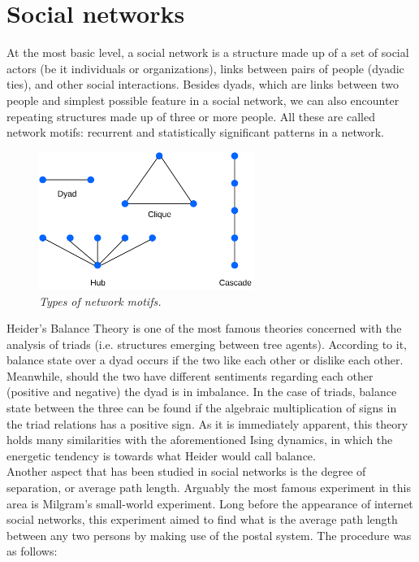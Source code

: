 \documentclass[12pt,openright,twoside]{book}
\begin{document}
\section{Social networks}

At the most basic level, a social network is a structure made up of a set of social actors (be it individuals or organizations), links between pairs of people (dyadic ties), and other social interactions\cite{hancean_2014,carrington_scott_2014}. Besides dyads, which are links between two people and simplest possible feature in a social network, we can also encounter repeating structures made up of three or more people. All these are called network motifs: recurrent and statistically significant patterns in a network.\\

\begin{figure}
\centering
\includegraphics[width=7cm]{figures/network_motifs.png}
\caption{\textit{{\small Types of network motifs.}}}
\label{fig1}
\end{figure}

Heider's Balance Theory\cite{heider_1958} is one of the most famous theories concerned with the analysis of triads (i.e. structures emerging between tree agents).  According to it, balance state over a dyad occurs if the two like each other or dislike each other. Meanwhile, should the two have different sentiments regarding each other (positive and negative) the dyad is in imbalance. In the case of triads, balance state between the three can be found if the algebraic multiplication of signs in the triad relations has a positive sign. As it is immediately apparent, this theory holds many similarities with the aforementioned Ising dynamics, in which the energetic tendency is towards what Heider would call balance.\\

Another aspect that has been studied in social networks is the degree of separation, or average path length\cite{newman_barabasi_2006}. Arguably the most famous experiment in this area is Milgram's small-world experiment\cite{milgram_1967}. Long before the appearance of internet social networks, this experiment aimed to find what is the average path length between any two persons by making use of the postal system. The procedure was as follows:\\
\end{document}
